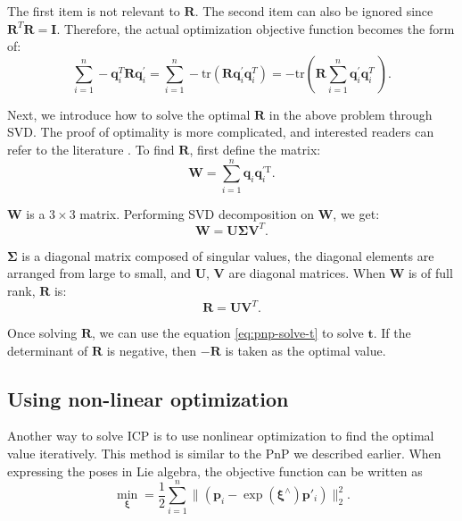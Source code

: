 The first item is not relevant to $\mathbf{R}$. The second item can also be ignored since $\mathbf{R}^T\mathbf{R}=\mathbf{I}$. Therefore, the actual optimization objective function becomes the form of:
\begin{equation}
\sum\limits_{i = 1}^n - \mathbf{q}_i^T \mathbf{R} \mathbf{q}^\prime_i = \sum\limits_{i = 1}^n -\mathrm{tr} \left( \mathbf{R} \mathbf{q}_i^{\prime} \mathbf{q}^T_i \right) = - \mathrm{tr} \left( \mathbf{R} \sum\limits_{i = 1}^n \mathbf{q}_i^{\prime} \mathbf{q}^T_i \ \right).
\end{equation}

Next, we introduce how to solve the optimal $\mathbf{R}$ in the above problem through SVD. The proof of optimality is more complicated, and interested readers can refer to the literature \cite{Arun1987, PomerleauColasSiegwart2015}. To find $\mathbf{R}$, first define the matrix:
\begin{equation}
\mathbf{W} =  \sum\limits_{i = 1}^n \mathbf{q}_i \mathbf{q}^{\prime \mathrm{T}}_i.
\end{equation}

$\mathbf{W}$ is a $3 \times 3$ matrix. Performing SVD decomposition on $\mathbf{W}$, we get:
\begin{equation}
\mathbf{W} = \mathbf{U} \boldsymbol{\Sigma} \mathbf{V}^T.
\end{equation}

$\boldsymbol{\Sigma}$ is a diagonal matrix composed of singular values, the diagonal elements are arranged from large to small, and $\mathbf{U}$, $\mathbf{V}$ are diagonal matrices. When $\mathbf{W}$ is of full rank, $\mathbf{R}$ is:
\begin{equation}
\mathbf{R} = \mathbf{U} \mathbf{V}^T.
\end{equation}

Once solving $\mathbf{R}$, we can use the equation \eqref{eq:pnp-solve-t} to solve $\mathbf{t}$. If the determinant of $\mathbf{R}$ is negative, then $-\mathbf{R}$ is taken as the optimal value.

\subsection{Using non-linear optimization}
Another way to solve ICP is to use nonlinear optimization to find the optimal value iteratively. This method is similar to the PnP we described earlier. When expressing the poses in Lie algebra, the objective function can be written as
\begin{equation}
\mathop {\min }\limits_{\boldsymbol{\xi}} = \frac{1}{2} \sum\limits_{i = 1}^n\| {\left( {{{\mathbf{p}}_i} - \exp \left( \boldsymbol{\xi}^\wedge \right) {\mathbf{p}}'_i} \right)} \|^2_2.
\end{equation}

